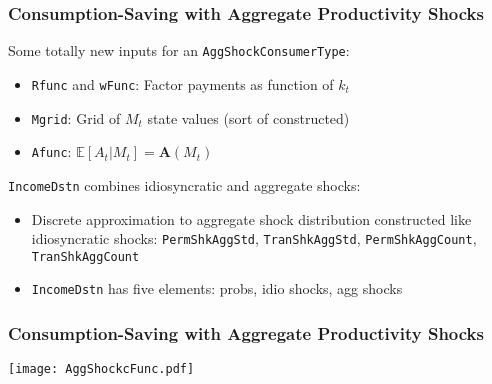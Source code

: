 \documentclass[11pt,handout]{beamer}
\newcommand{\E}{\mathbb{E}}
\begin{document}
\begin{frame}
\frametitle{Consumption-Saving with Aggregate Productivity Shocks}
Some totally new inputs for an \texttt{AggShockConsumerType}:
\begin{itemize}
\item \texttt{Rfunc} and \texttt{wFunc}: Factor payments as function of $k_t$

\item \texttt{Mgrid}: Grid of $M_t$ state values (sort of constructed)

\item \texttt{Afunc}: $\E[A_t | M_t] = \mathbf{A}(M_t)$
\end{itemize}

\texttt{IncomeDstn} combines idiosyncratic and aggregate shocks:
\begin{itemize}
\item Discrete approximation to aggregate shock distribution constructed like idiosyncratic shocks: \texttt{PermShkAggStd}, \texttt{TranShkAggStd}, \texttt{PermShkAggCount}, \texttt{TranShkAggCount}

\item \texttt{IncomeDstn} has five elements: probs, idio shocks, agg shocks
\end{itemize}
\end{frame}

\begin{frame}
\frametitle{Consumption-Saving with Aggregate Productivity Shocks}
\begin{center}
\texttt{[image: AggShockcFunc.pdf]}
\end{center}
\end{frame}
\end{document}
